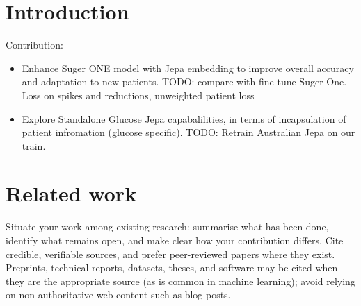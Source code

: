 \documentclass[11pt,a4paper]{article}
\begin{document}
\maketitle

\begin{center}
\end{center}

\begin{abstract}
Write a short abstract here, roughly 150--250 words: the
problem, your approach, and your main result, in plain
language. Do not include anything that identifies you or your
institution.
\end{abstract}

\section{Introduction}

Contribution:
\begin{itemize}
    \item Enhance Suger ONE model with Jepa embedding to improve overall accuracy and adaptation to new patients. TODO: compare with fine-tune Suger One. Loss on spikes and reductions, unweighted patient loss
    \item Explore Standalone Glucose Jepa capabalilities, in terms of incapsulation of patient infromation (glucose specific). TODO: Retrain Australian Jepa on our train. 
\end{itemize}

\section{Related work}
Situate your work among existing research: summarise what has
been done, identify what remains open, and make clear how your
contribution differs. Cite credible, verifiable sources, and
prefer peer-reviewed papers where they exist. Preprints,
technical reports, datasets, theses, and software may be cited
when they are the appropriate source (as is common in machine
learning); avoid relying on non-authoritative web content such
as blog posts.
\end{document}
